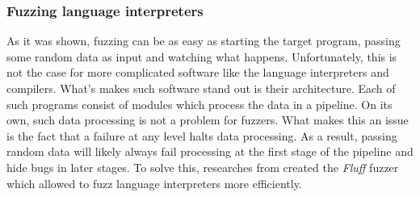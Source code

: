 \subsubsection{Fuzzing language interpreters}
As it was shown, fuzzing can be as easy as starting the target program, passing some random data as input and watching what happens. Unfortunately, this is not the case for more complicated software like the language interpreters and compilers. What's makes such software stand out is their architecture. Each of such programs consist of modules which process the data in a pipeline. On its own, such data processing is not a problem for fuzzers. What makes this an issue is the fact that a failure at any level halts data processing. As a result, passing random data will likely always fail processing at the first stage of the pipeline and hide bugs in later stages. To solve this, researches from \cite{dominiak2019efficient} created the \textit{Fluff} fuzzer which allowed to fuzz language interpreters more efficiently.

